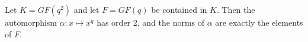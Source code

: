 Let $K = GF(q^2)$ and let $F = GF(q)$ be contained in $K$. Then the automorphism $\alpha : x \mapsto x^q$ has order 2, and the norms of $\alpha$ are exactly the elements of $F$.
